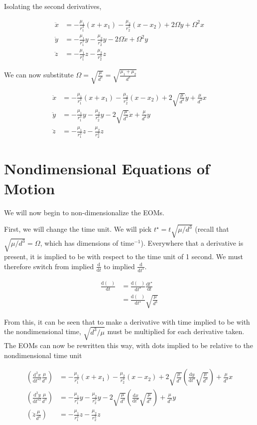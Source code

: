 \documentclass{article}
\newcommand{\dd}[2]{\frac{\mathrm{d}#1}{\mathrm{d}#2}}
\begin{document}
Isolating the second derivatives,

\[\begin{aligned}
    \ddot{x}&=-\frac{\mu_1}{r_1^3}(x+x_1)-\frac{\mu_2}{r_2^3}(x-x_2)+2\Omega\dot{y}+\Omega^2 x\\
    \ddot{y}&=-\frac{\mu_1}{r_1^3}y-\frac{\mu_2}{r_2^3}y-2\Omega\dot{x}+\Omega^2 y\\
    \ddot{z}&=-\frac{\mu_1}{r_1^3}z-\frac{\mu_2}{r_2^3}z
\end{aligned}\]
    
We can now substitute $\Omega=\sqrt{\frac{\mu}{d^3}}=\sqrt{\frac{\mu_1+\mu_2}{d^3}}$

\[\boxed{\begin{aligned}
    \ddot{x}&=-\frac{\mu_1}{r_1^3}(x+x_1)-\frac{\mu_2}{r_2^3}(x-x_2)+2\sqrt{\frac{\mu}{d^3}}\dot{y}+\frac{\mu}{d^3}x\\
    \ddot{y}&=-\frac{\mu_1}{r_1^3}y-\frac{\mu_2}{r_2^3}y-2\sqrt{\frac{\mu}{d^3}}\dot{x}+\frac{\mu}{d^3}y\\
    \ddot{z}&=-\frac{\mu_1}{r_1^3}z-\frac{\mu_2}{r_2^3}z
\end{aligned}}\]

\section*{Nondimensional Equations of Motion}
We will now begin to non-dimensionalize the EOMs.

First, we will change the time unit. We will pick $t^\star=t\sqrt{\mu/d^3}$ (recall that $\sqrt{\mu/d^3}=\Omega$, which has dimensions of $\text{time}^{-1}$). Everywhere that a derivative is present, it is implied to be with respect to the time unit of 1 second. We must therefore switch from implied $\dd{}{t}$ to implied $\dd{}{t^\star}$.

\[\begin{aligned}
    \dd{(\phantom{x})}{t}&=\dd{(\phantom{x})}{t^\star}\dd{t^\star}{t}\\
    &=\dd{(\phantom{x})}{t^\star}\sqrt{\frac{\mu}{d^3}}
\end{aligned}\]

From this, it can be seen that to make a derivative with time implied to be with the nondimensional time, $\sqrt{d^3/\mu}$ must be multiplied for each derivative taken. The EOMs can now be rewritten this way, with dots implied to be relative to the nondimensional time unit

\[\begin{aligned}
    \left(\dd{^2x}{t^{\star2}}\frac{\mu}{d^3}\right)&=-\frac{\mu_1}{r_1^3}(x+x_1)-\frac{\mu_2}{r_2^3}(x-x_2)+2\sqrt{\frac{\mu}{d^3}}\left(\dd{y}{t^\star}\sqrt{\frac{\mu}{d^3}}\right)+\frac{\mu}{d^3}x\\
    \left(\dd{^2y}{t^{\star2}}\frac{\mu}{d^3}\right)&=-\frac{\mu_1}{r_1^3}y-\frac{\mu_2}{r_2^3}y-2\sqrt{\frac{\mu}{d^3}}\left(\dd{x}{t^\star}\sqrt{\frac{\mu}{d^3}}\right)+\frac{\mu}{d^3}y\\
    \left(\ddot{z}\frac{\mu}{d^3}\right)&=-\frac{\mu_1}{r_1^3}z-\frac{\mu_2}{r_2^3}z
\end{aligned}\]
\end{document}
